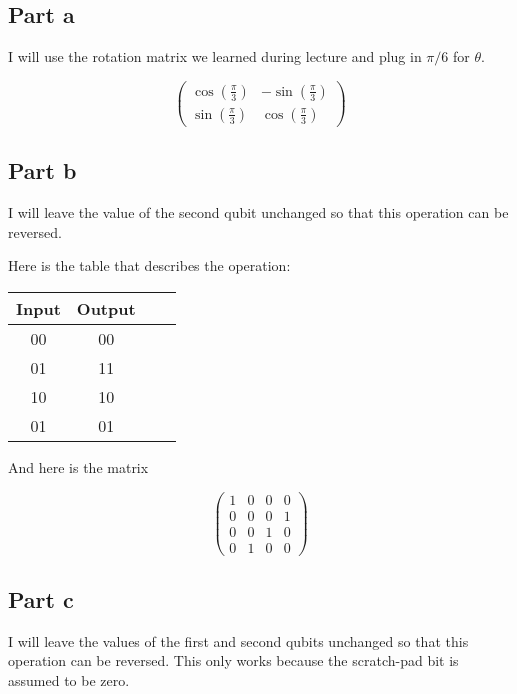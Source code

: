 \documentclass[12pt]{article}
\begin{document}
\subsection*{Part a}


I will use the rotation matrix we learned during lecture and plug in $\pi/6$ for $\theta$.

\begin{equation}
\begin{pmatrix}
\cos(\frac{\pi}{3}) & -\sin(\frac{\pi}{3}) \\
\sin(\frac{\pi}{3}) & \cos(\frac{\pi}{3})
\end{pmatrix}
\end{equation}

\subsection*{Part b}

I will leave the value of the second qubit unchanged so that this operation can be reversed.

Here is the table that describes the operation:

\begin{center}
\begin{tabular}{|c|c|c|c|}
\hline
Input & Output  \\
\hline
00 & 00 \\
01 & 11 \\
10 & 10 \\
01 & 01 \\
\hline
\end{tabular}
\end{center}

And here is the matrix


\begin{equation}
\begin{pmatrix}
	1 & 0 & 0 & 0 \\
	0 & 0 & 0 & 1 \\
	0 & 0 & 1 & 0 \\
	0 & 1 & 0 & 0
\end{pmatrix}
\end{equation}

\subsection*{Part c}

I will leave the values of the first and second qubits unchanged so that this operation can be reversed. This only works because the scratch-pad bit is assumed to be zero.
\end{document}
